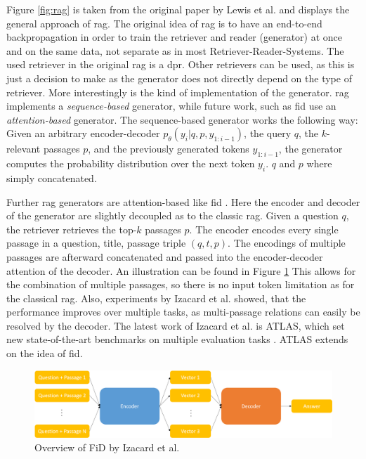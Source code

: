 Figure \ref{fig:rag} is taken from the original paper by Lewis et al. \cite{lewis_retrieval-augmented_2021} and displays the general approach of \gls{rag}. The original idea of \gls{rag} is to have an end-to-end backpropagation in order to train the retriever and reader (generator) at once and on the same data, not separate as in most Retriever-Reader-Systems. The used retriever in the original \gls{rag} is a \gls{dpr}. Other retrievers can be used, as this is just a decision to make as the generator does not directly depend on the type of retriever. More interestingly is the kind of implementation of the generator. \gls{rag} implements a \textit{sequence-based} generator, while future work, such as \gls{fid} \cite{izacard_leveraging_2021} use an \textit{attention-based} generator. The sequence-based generator works the following way: Given an arbitrary encoder-decoder $p_{\theta}(y_i | q, p, y_{1:i-1})$, the query $q$, the $k$-relevant passages $p$, and the previously generated tokens $y_{1:i-1}$, the generator computes the probability distribution over the next token $y_i$. $q$ and $p$ where simply concatenated.

Further \gls{rag} generators are attention-based like \gls{fid} \cite{izacard_leveraging_2021}. Here the encoder and decoder of the generator are slightly decoupled as to the classic \gls{rag}. Given a question $q$, the retriever retrieves the top-$k$ passages $p$. The encoder encodes every single passage in a question, title, passage triple $(q, t, p)$. The encodings of multiple passages are afterward concatenated and passed into the encoder-decoder attention of the decoder. An illustration can be found in Figure \ref{fig:fid} This allows for the combination of multiple passages, so there is no input token limitation as for the classical \gls{rag}. Also, experiments by Izacard et al. showed, that the performance improves over multiple tasks, as multi-passage relations can easily be resolved by the decoder. The latest work of Izacard et al. is ATLAS, which set new state-of-the-art benchmarks on multiple evaluation tasks \cite{izacard_atlas_2022}. ATLAS extends on the idea of \gls{fid}.   

\begin{figure}
    \centering
    \includegraphics[width=\textwidth]{Grafiken/fid.png}
    \caption{Overview of FiD by Izacard et al. \cite{izacard_leveraging_2021}}
    \label{fig:fid}
\end{figure}

